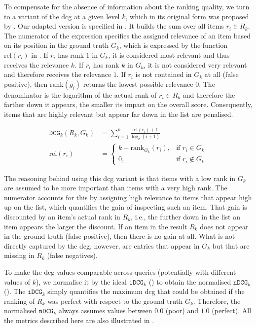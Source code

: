 To compensate for the absence of information about the ranking quality, we turn to a variant of the \acrshort{dcg} at a given level $k$, which in its original form was proposed by \cite{Jarvelin:2002Cumulated}. Our adapted version is specified in . It builds the sum over all items $r_i \in R_k$. The numerator of the expression specifies the assigned relevance of an item based on its position in the ground truth $G_k$, which is expressed by the function $\text{rel} (r_i)$ in . If $r_i$ has rank $1$ in $G_k$, it is considered most relevant and thus receives the relevance $k$. If $r_i$ has rank $k$ in $G_k$, it is not considered very relevant and therefore receives the relevance $1$. If $r_i$ is not contained in $G_k$ at all (false positive), then $\text{rank} (g_i)$ returns the lowest possible relevance $0$. The denominator is the logarithm of the actual rank of $r_i \in R_k$ and therefore the farther down it appears, the smaller its impact on the overall score. Consequently, items that are highly relevant but appear far down in the list are penalised.

\begin{align}
\label{equation:dcg}
\mathtt{DCG}_k (R_k, G_k) &= \sum_{i = 1}^{k} \frac{\text{rel}(r_i) + 1}{\log_2(i + 1)} \\
\label{equation:dcg_rel}
\text{rel} (r_i) &= 
    \begin{cases}
        k - \text{rank}_{G_k}(r_i), &  \text{if } r_i \in G_k \\
        0,                          &  \text{if } r_i \notin G_k
    \end{cases}
\end{align}

The reasoning behind using this \acrshort{dcg} variant is that items with a low rank in $G_k$ are assumed to be more important than items with a very high rank. The numerator accounts for this by assigning high relevance to items that appear high up on the list, which quantifies the gain of inspecting such an item. That gain is discounted by an item's actual rank in $R_k$, i.e., the further down in the list an item appears the larger the discount. If an item in the result $R_k$ does not appear in the ground truth (false positive), then there is no gain at all. What is not directly captured by the \acrshort{dcg}, however, are entries that appear in $G_k$ but that are missing in $R_k$ (false negatives).

To make the \acrshort{dcg} values comparable across queries (potentially with different values of $k$), we normalise it by the ideal $\mathtt{iDCG}_k$ () to obtain the normalised $\mathtt{nDCG}_k$ (). The $\mathtt{iDCG}_k$ simply quantifies the maximum \acrshort{dcg} that could be obtained if the ranking of $R_k$ was perfect with respect to the ground truth $G_k$. Therefore, the normalised $\mathtt{nDCG}_k$ always assumes values between $0.0$ (poor) and $1.0$ (perfect). All the metrics described here are also illustrated in .

